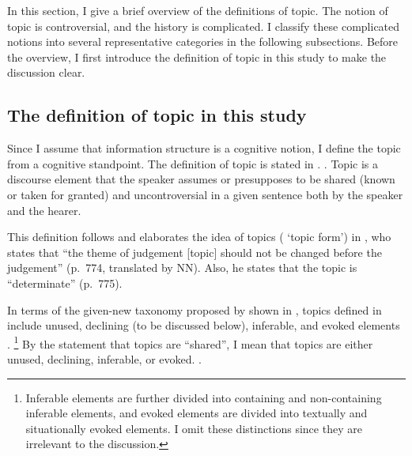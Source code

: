 In this section, I give a brief overview of the definitions of topic.
The notion of topic is controversial, and the history is complicated.
I classify these complicated notions into several representative categories in the following subsections.
Before the overview, I first introduce the definition of topic in this study to make the discussion clear.

\subsection{The definition of topic in this study}\label{BackSubsecDefTopic}





Since I assume that information structure is a cognitive notion, I define the topic from a cognitive standpoint.
The definition of topic is stated in \Next.
%
\ex. \label{BackDefTopic} Topic is a discourse element that the speaker assumes or presupposes to be shared (known or taken for granted) and uncontroversial in a given sentence both by the speaker and the hearer.

This definition follows and elaborates the idea of topics ( `topic form') in ,
who states that ``the theme of judgement [topic] should not be changed before the judgement'' (p.~774, translated by NN).
Also, he states that the topic is ``determinate'' (p.~775).

In terms of the given-new taxonomy proposed by  shown in \Next,
topics defined in \Last include unused, declining (to be discussed below), inferable, and evoked elements \cite[\S 4.4.2]{lambrecht94}.%
 \footnote{
 Inferable elements are further divided into containing and non-containing inferable elements, and
 evoked elements are divided into textually and situationally evoked elements.
 I omit these distinctions since they are irrelevant to the discussion.
 }
%
By the statement that topics are ``shared'',
I mean that topics are either unused, declining, inferable, or evoked.
\vspace{0.5cm}
%
\ex.\label{Back:Top:DefTop:GNTaxonomy}

